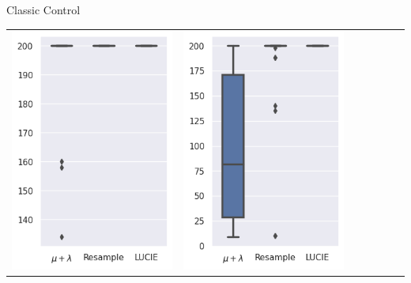 \begin{frame}{\tcv{} Classic Control}
\begin{table}
\begin{tabular}{ccccccc}
                \includegraphics[width=\figwidth]{images/LUCIE/cartpole/boxplot_cartpole_200.png} &
                \includegraphics[width=\figwidth]{images/LUCIE/cartpole/boxplot_cartpole_400.png} &

\end{tabular}
\end{table}
\end{frame}
